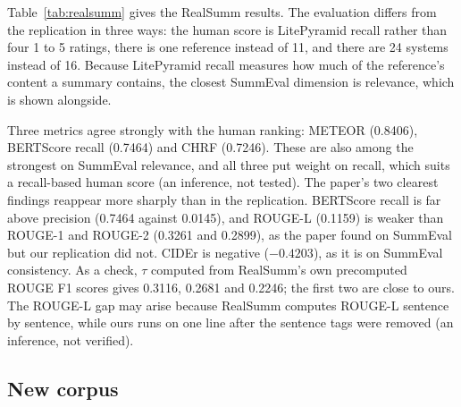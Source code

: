 \documentclass[11pt]{article}
\begin{document}
Table~\ref{tab:realsumm} gives the RealSumm results. The evaluation differs from the replication in three ways: the human score is LitePyramid recall rather than four 1 to 5 ratings, there is one reference instead of 11, and there are 24 systems instead of 16. Because LitePyramid recall measures how much of the reference's content a summary contains, the closest SummEval dimension is relevance, which is shown alongside.

Three metrics agree strongly with the human ranking: METEOR (0.8406), BERTScore recall (0.7464) and CHRF (0.7246). These are also among the strongest on SummEval relevance, and all three put weight on recall, which suits a recall-based human score (an inference, not tested). The paper's two clearest findings reappear more sharply than in the replication. BERTScore recall is far above precision (0.7464 against 0.0145), and ROUGE-L (0.1159) is weaker than ROUGE-1 and ROUGE-2 (0.3261 and 0.2899), as the paper found on SummEval but our replication did not. CIDEr is negative ($-0.4203$), as it is on SummEval consistency. As a check, $\tau$ computed from RealSumm's own precomputed ROUGE F1 scores gives 0.3116, 0.2681 and 0.2246; the first two are close to ours. The ROUGE-L gap may arise because RealSumm computes ROUGE-L sentence by sentence, while ours runs on one line after the sentence tags were removed (an inference, not verified).

\subsection{New corpus}
\label{sec:res-corpus}
\end{document}
